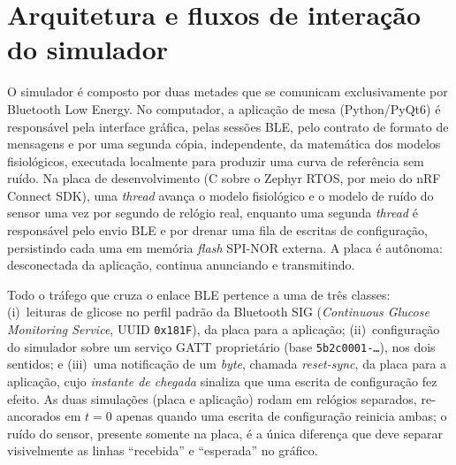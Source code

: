 %
%
%

\section{Arquitetura e fluxos de interação do simulador}
\label{sec:arquitetura-fluxos}

O simulador é composto por duas metades que se comunicam exclusivamente por
Bluetooth Low Energy. No computador, a aplicação de mesa (Python/PyQt6) é
responsável pela interface gráfica, pelas sessões BLE, pelo contrato de
formato de mensagens e por uma segunda cópia, independente, da matemática dos
modelos fisiológicos, executada localmente para produzir uma curva de
referência sem ruído. Na placa de desenvolvimento (C sobre o Zephyr RTOS, por
meio do nRF Connect SDK), uma \textit{thread} avança o modelo fisiológico e o
modelo de ruído do sensor uma vez por segundo de relógio real, enquanto uma
segunda \textit{thread} é responsável pelo envio BLE e por drenar uma fila de
escritas de configuração, persistindo cada uma em memória \textit{flash}
SPI-NOR externa. A placa é autônoma: desconectada da aplicação, continua
anunciando e transmitindo.

Todo o tráfego que cruza o enlace BLE pertence a uma de três classes:
(i)~leituras de glicose no perfil padrão da Bluetooth SIG (\textit{Continuous
Glucose Monitoring Service}, UUID \texttt{0x181F}), da placa para a aplicação;
(ii)~configuração do simulador sobre um serviço GATT proprietário (base
\texttt{5b2c0001-\ldots}), nos dois sentidos; e (iii)~uma notificação de um
\textit{byte}, chamada \textit{reset-sync}, da placa para a aplicação, cujo
\emph{instante de chegada} sinaliza que uma escrita de configuração fez
efeito. As duas simulações (placa e aplicação) rodam em relógios separados,
re-ancorados em $t = 0$ apenas quando uma escrita de configuração reinicia
ambas; o ruído do sensor, presente somente na placa, é a única diferença que
deve separar visivelmente as linhas ``recebida'' e ``esperada'' no gráfico.

